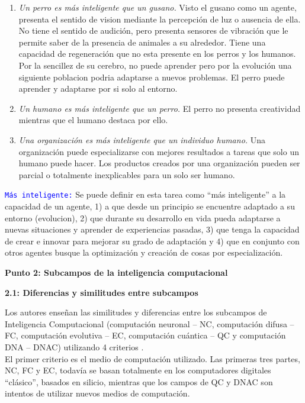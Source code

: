 \documentclass[10pt,onecolumn,twoside,letterpaper]{article}
\begin{document}
\begin{enumerate}
\item \emph{Un perro es m\'as inteligente que un gusano.} 
Visto el gusano como un agente, presenta el sentido de vision mediante la percepci\'on de luz o ausencia de ella. No tiene el sentido de audici\'on, pero presenta sensores de vibraci\'on que le permite saber de la presencia de animales a su alrededor. Tiene una capacidad de regeneraci\'on que no esta presente en los perros y los humanos\cite{website:lifeworm}. Por la sencillez de su cerebro, no puede aprender pero por la evoluci\'on una siguiente poblacion podria adaptarse a nuevos problemas.
El perro puede aprender y adaptarse por si solo al entorno. 
\item \emph{Un humano es m\'as inteligente que un perro.}
El perro no presenta creatividad mientras que el humano destaca por ello.
\item \emph{Una organizaci\'on es m\'as inteligente que un individuo humano.}
Una organizaci\'on puede especializarse con mejores resultados a tareas que solo un humano puede hacer. Los productos creados por una organizaci\'on pueden ser parcial o totalmente inexplicables para un solo ser humano. 
\end{enumerate}
\par \textcolor{blue}{\texttt{M\'as inteligente:}} Se puede definir en esta tarea como ``m\'as inteligente'' a la capacidad de un agente, 1) a que desde un principio se encuentre adaptado a su entorno (evolucion), 2) que durante su desarrollo en vida pueda adaptarse a nuevas situaciones y aprender de experiencias pasadas, 3) que tenga la capacidad de crear e innovar para mejorar su grado de adaptaci\'on y 4) que en conjunto con otros agentes busque la optimizaci\'on y creaci\'on de cosas por especializaci\'on.\\
\par{\bf \large Punto 2: Subcampos de la inteligencia computacional}\\
\par{\bf 2.1: Diferencias y similitudes entre subcampos}\\
\par Los autores ense\~nan las similitudes y diferencias entre los subcampos de Inteligencia Computacional (computaci\'on neuronal – NC, computaci\'on difusa – FC, computaci\'on evolutiva – EC, computaci\'on cu\'antica – QC y computaci\'on DNA – DNAC) utilizando 4 criterios \cite{Craenen}.\\
El primer criterio es el medio de computaci\'on utilizado. Las primeras tres partes, NC, FC y EC, todav\'ia se basan totalmente en los computadores digitales ``cl\'asico'', basados en silicio, mientras que los campos de QC y DNAC son intentos de utilizar nuevos medios de computaci\'on.\\
\end{document}
